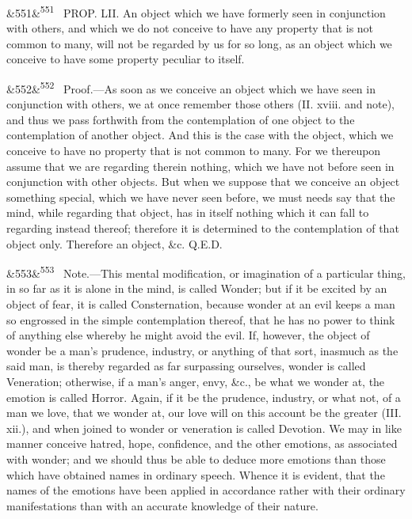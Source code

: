 \documentclass[12pt]{article}
\newcommand{\para}[1][]{\par\noindent\ifx&#1&\else\textsuperscript{\footnotesize #1}~\fi}
\begin{document}
\para[551] PROP. LII. An object which we have formerly seen in conjunction with others, and which we do not conceive to have any property that is not common to many, will not be regarded by us for so long, as an object which we conceive to have some property peculiar to itself.

\para[552] Proof.---As soon as we conceive an object which we have seen in conjunction with others, we at once remember those others (II. xviii. and note), and thus we pass forthwith from the contemplation of one object to the contemplation of another object. And this is the case with the object, which we conceive to have no property that is not common to many. For we thereupon assume that we are regarding therein nothing, which we have not before seen in conjunction with other objects. But when we suppose that we conceive an object something special, which we have never seen before, we must needs say that the mind, while regarding that object, has in itself nothing which it can fall to regarding instead thereof; therefore it is determined to the contemplation of that object only. Therefore an object, \&c. Q.E.D.

\para[553] Note.---This mental modification, or imagination of a particular thing, in so far as it is alone in the mind, is called Wonder; but if it be excited by an object of fear, it is called Consternation, because wonder at an evil keeps a man so engrossed in the simple contemplation thereof, that he has no power to think of anything else whereby he might avoid the evil. If, however, the object of wonder be a man's prudence, industry, or anything of that sort, inasmuch as the said man, is thereby regarded as far surpassing ourselves, wonder is called Veneration; otherwise, if a man's anger, envy, \&c., be what we wonder at, the emotion is called Horror. Again, if it be the prudence, industry, or what not, of a man we love, that we wonder at, our love will on this account be the greater (III. xii.), and when joined to wonder or veneration is called Devotion. We may in like manner conceive hatred, hope, confidence, and the other emotions, as associated with wonder; and we should thus be able to deduce more emotions than those which have obtained names in ordinary speech. Whence it is evident, that the names of the emotions have been applied in accordance rather with their ordinary manifestations than with an accurate knowledge of their nature.
\end{document}

